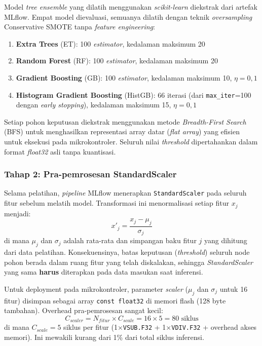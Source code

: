 Model \textit{tree ensemble} yang dilatih menggunakan \textit{scikit-learn} diekstrak dari artefak MLflow. Empat model dievaluasi, semuanya dilatih dengan teknik \textit{oversampling} Conservative SMOTE tanpa \textit{feature engineering}:

\begin{enumerate}
    \item \textbf{Extra Trees} (ET): 100 \textit{estimator}, kedalaman maksimum 20
    \item \textbf{Random Forest} (RF): 100 \textit{estimator}, kedalaman maksimum 20
    \item \textbf{Gradient Boosting} (GB): 100 \textit{estimator}, kedalaman maksimum 10, $\eta = 0{,}1$
    \item \textbf{Histogram Gradient Boosting} (HistGB): 66 iterasi (dari \texttt{max\_iter}=100 dengan \textit{early stopping}), kedalaman maksimum 15, $\eta = 0{,}1$
\end{enumerate}

Setiap pohon keputusan diekstrak menggunakan metode \textit{Breadth-First Search} (BFS) untuk menghasilkan representasi array datar (\textit{flat array}) yang efisien untuk eksekusi pada mikrokontroler. Seluruh nilai \textit{threshold} dipertahankan dalam format \textit{float32} asli tanpa kuantisasi.

\subsubsection{Tahap 2: Pra-pemrosesan StandardScaler}
\label{subsec:standardscaler}

Selama pelatihan, \textit{pipeline} MLflow menerapkan \texttt{StandardScaler} pada seluruh fitur sebelum melatih model. Transformasi ini menormalisasi setiap fitur $x_j$ menjadi:
\begin{equation}
    x'_j = \frac{x_j - \mu_j}{\sigma_j}
\end{equation}
di mana $\mu_j$ dan $\sigma_j$ adalah rata-rata dan simpangan baku fitur $j$ yang dihitung dari data pelatihan. Konsekuensinya, batas keputusan (\textit{threshold}) seluruh node pohon berada dalam ruang fitur yang telah diskalakan, sehingga \textit{StandardScaler} yang sama \textbf{harus} diterapkan pada data masukan saat inferensi.

Untuk deployment pada mikrokontroler, parameter \textit{scaler} ($\mu_j$ dan $\sigma_j$ untuk 16 fitur) disimpan sebagai array \texttt{const float32} di memori flash (128 byte tambahan). Overhead pra-pemrosesan sangat kecil:
\begin{equation}
    C_{scaler} = N_{fitur} \times C_{scale} = 16 \times 5 = 80 \text{ siklus}
\end{equation}
di mana $C_{scale} = 5$ siklus per fitur (1$\times$\texttt{VSUB.F32} + 1$\times$\texttt{VDIV.F32} + overhead akses memori). Ini mewakili kurang dari 1\% dari total siklus inferensi.

